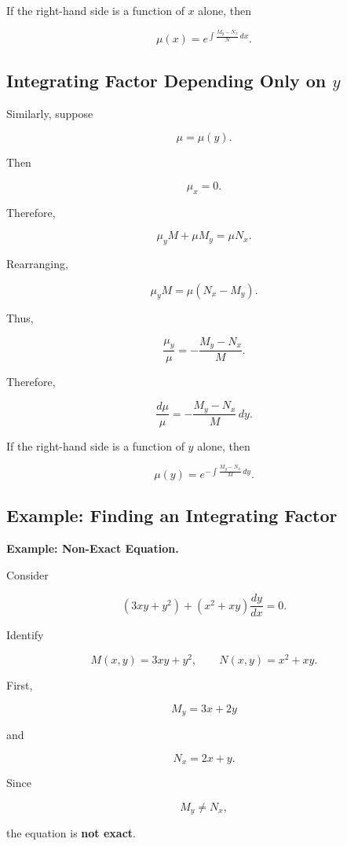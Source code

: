 \documentclass[11pt]{article}
\newenvironment{examplebox}[1]
    {\par\medskip\noindent\textbf{Example: #1.}\par}
    {\par\medskip}
\begin{document}
If the right-hand side is a function of $x$ alone, then

\[
\boxed{
\mu(x)
=
e^{\int\frac{M_y-N_x}{N}\,dx}
}.
\]

\subsection{Integrating Factor Depending Only on
\texorpdfstring{$y$}{y}}

Similarly, suppose

\[
\mu=\mu(y).
\]

Then

\[
\mu_x=0.
\]

Therefore,

\[
\mu_yM+\mu M_y
=
\mu N_x.
\]

Rearranging,

\[
\mu_yM
=
\mu(N_x-M_y).
\]

Thus,

\[
\frac{\mu_y}{\mu}
=
-\frac{M_y-N_x}{M}.
\]

Therefore,

\[
\boxed{
\frac{d\mu}{\mu}
=
-\frac{M_y-N_x}{M}\,dy
}.
\]

If the right-hand side is a function of $y$ alone, then

\[
\boxed{
\mu(y)
=
e^{-\int\frac{M_y-N_x}{M}\,dy}
}.
\]

\subsection{Example: Finding an Integrating Factor}

\begin{examplebox}{Non-Exact Equation}

Consider

\[
(3xy+y^2)
+
(x^2+xy)\frac{dy}{dx}
=0.
\]

Identify

\[
M(x,y)=3xy+y^2,
\qquad
N(x,y)=x^2+xy.
\]

First,

\[
M_y=3x+2y
\]

and

\[
N_x=2x+y.
\]

Since

\[
M_y\neq N_x,
\]

the equation is \textbf{not exact}.

\end{examplebox}
\end{document}
